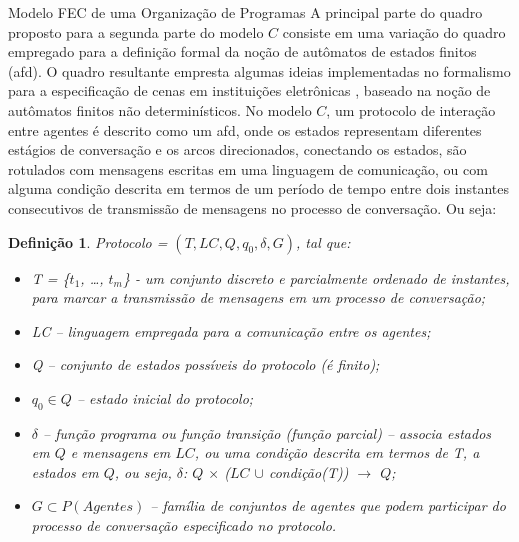 \begin{section}{Modelo FEC de uma Organização de Programas}
        A principal parte do quadro proposto para a segunda parte do modelo $C$ consiste em uma variação do quadro empregado para a definição formal da noção de autômatos de estados finitos (\acrshort{afd}). O quadro resultante empresta algumas ideias implementadas no formalismo para a especificação de cenas em instituições eletrônicas \cite{vasconcelos2002approach}, baseado na noção de autômatos finitos não determinísticos. No modelo $C$, um protocolo de interação entre agentes é descrito como um \acrshort{afd}, onde os estados representam diferentes estágios de conversação e os arcos direcionados, conectando os estados, são rotulados com mensagens escritas em uma linguagem de comunicação, ou com alguma condição descrita em termos de um período de tempo entre dois instantes consecutivos de transmissão de mensagens no processo de conversação. Ou seja:
        
        \newtheorem{theorem}{Definição}

        
        \begin{theorem}
            Protocolo = $(T, LC, Q, q_0, \delta, G)$, tal que:
            \begin{itemize}
                \item T = \{$t_1$, \ldots, $t_m$\} - um conjunto discreto e parcialmente ordenado de instantes, para marcar a transmissão de mensagens em um processo de conversação;
                \item LC – linguagem empregada para a comunicação entre os agentes;
                \item Q – conjunto de estados possíveis do protocolo (é finito);
                \item $q_0 \in Q$ – estado inicial do protocolo;
                \item $\delta$ – função programa ou função transição (função parcial) – associa estados em $Q$ e mensagens em $LC$, ou uma condição descrita em termos de T, a estados em $Q$, ou seja, $\delta$: $Q$ $\times$ ($LC$ $\cup$ condição(T)) $\to$ $Q$;
                \item $G \subset P(Agentes)$ – família de conjuntos de agentes que podem participar do processo de conversação especificado no protocolo.
            \end{itemize}
        \end{theorem}
        

\end{section}
